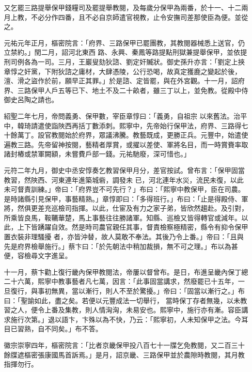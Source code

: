 \begin{pinyinscope}
 又乞罷三路提舉保甲錢糧司及罷提舉教閱，及每歲分保甲為兩番，於十一、十二兩月上教，不必分作四番，且不必自京師遣官視教，止令安撫司差那使臣為便。並從之。



 元祐元年正月，樞密院言：「府界、三路保甲已罷團教，其教閱器械悉上送官，仍立禁約。」閏二月，詔河北東西
 路、永興、秦鳳等路提點刑獄兼提舉保甲，並依提刑司例各為一司。三月，王巖叟劾狄諮、劉定奸贓狀。御史孫升亦言：「劉定上挾章惇之奸黨，下附狄諮之庸材，大肆憑陵，公行恐喝，故真定獲鹿之變起於後，澶、滑之盜作於前，願早正其罪。」於是諮、定皆罷，與在外宮觀。十一月，詔府界、三路保甲人戶五等已下、地土不及二十畝者，雖三丁以上，並免教。從殿中侍御史呂陶之請也。



 紹聖二年七月，帝問義勇、保甲數，宰臣章惇曰：「義勇，自祖宗
 以來舊法。治平中，韓琦請遣使詣陜西再括丁數添刺。熙寧中，先帝始行保甲法，府界、三路得七十餘萬丁。設官教閱始於府界，眾議沸騰。教藝既成，更勝正兵。元豐中，始遣使遍教三路。先帝留神按閱，藝精者厚賞，或擢以差使、軍將名目，而一時賞賚率取諸封樁或禁軍闕額，未嘗費戶部一錢。元祐馳廢，深可惜也。」



 元符二年九月，御史中丞安惇奏乞教習保甲月分，差官按試。曾布言：「保甲固當教習，然陜西、河東連年進築城砦，調發未
 已，河北連年水災，流民未復，以此未可督責訓練。」帝曰：「府界豈不可先行？」布曰：「熙寧中教保甲，臣在司農。是時諸縣引見保甲，事藝精熟。」章惇即曰：「多得班行。」布曰：「止是得殿侍、軍將，然俱更差充巡檢司指揮。以此，仕宦及有力之家子弟，皆欣然趨赴。及引對，所乘皆良馬，鞍韉華楚，馬上事藝往往勝諸軍。知縣、巡檢又皆得轉官或減年。以此，上下皆踴躍自效。然是時司農官親任其事，督責檢察極精密，縣令有抑令保甲置衣裝非理騷擾
 者，亦皆沖替，故人莫敢不奉法。其後乃令上番。」帝曰：「且與先是府界檢舉施行。」蔡卞曰：「於先朝法中稍加裁損，無不可之理。」布以為甚便，容檢尋文字進呈。



 十一月，蔡卞勸上復行畿內保甲教閱法，帝屢以督曾布。是日，布進呈畿內保丁總二十六萬，熙寧中教事藝者凡七萬，因言：「此事固當講求，然廢罷已十五年，一旦復行，與事初無異，當以漸行，則人不至於驚擾。」帝曰：「固當以漸行之。」布曰：「聖諭如此，盡之矣。若便以元豐成法一切舉行，
 當時保丁存者無幾，以未教習之人，便令上番及集教，則人情洶洶，未易安也。熙寧中，施行亦有漸。容臣講求施行次第。」退以語卞，卞殊以為不快，乃云：「熙寧初，人未知保甲之法。今耳目已習熟，自不同矣。」布不答。



 徽宗崇寧四年，樞密院言：「比者京畿保甲投八百七十一牒乞免教閱，又二百三十餘牒遮樞密張康國馬首訴焉。」是月，詔京畿、三路保甲並於農隙時教閱，其月教指揮勿行。




\end{pinyinscope}
